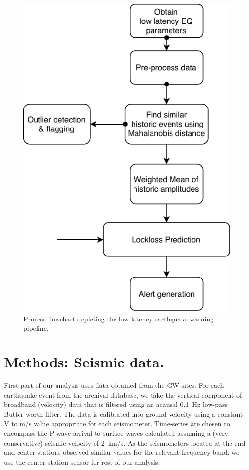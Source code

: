 \documentclass[twocolumn, aps, superscriptaddress]{revtex4}
\begin{document}
 \begin{figure}[!htb]
 \includegraphics[scale=0.7]{./plots/SEISMON_flowchart.pdf}
 \caption{Process flowchart depicting the low latency earthquake warning pipeline.}
 \label{fig:flowchart}
\end{figure}   

\section{Methods: Seismic data.}\label{sec:data}

First part of our analysis uses data obtained from the GW sites. For each earthquake event from the archival database, we take the vertical component of broadband (velocity) data that is filtered using an acausal 0.1\, Hz low-pass Butter-worth filter. The data is calibrated into ground velocity using a constant V to m/s value appropriate for each seismometer. Time-series are chosen to encompass the P-wave arrival to surface waves calculated assuming a (very conservative) seismic velocity of 2\, km/s. As the seismometers located at the end and center stations observed similar values for the relevant frequency band, we use the center station sensor for rest of our analysis.
\end{document}
